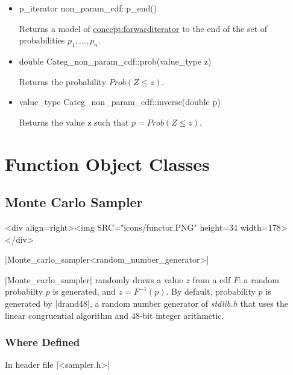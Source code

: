 \documentclass[12pt,twoside]{report}
\begin{document}
\begin{itemize}
\item
 \begin{code}
p_iterator non_param_cdf::p_end()
\end{code}

Returns a model of \hyperref{Forward Iterator}{Forward Iterator (see Section}{)}{concept:forwarditerator} to the end of the set of probabilities $p_1,\ldots,p_n$.



\item 
\begin{code}
double Categ_non_param_cdf::prob(value_type z)
\end{code}

Returns the probability $Prob(Z \le z)$.

\item 
\begin{code}
value_type Categ_non_param_cdf::inverse(double p)
\end{code}

Returns the value z such that $p=Prob(Z \le z)$.

\end{itemize}





\section{Function Object Classes}


\subsection{Monte Carlo Sampler}
\begin{htmlonly}
<div align=right><img SRC="icons/functor.PNG" height=34 width=178></div>
\end{htmlonly}

|Monte_carlo_sampler<random_number_generator>|
\vspace{0.3cm}

|Monte_carlo_sampler| randomly draws a value $z$ from a cdf $F$: a random probabilty $p$ is generated, and $z=F^{-1}(p)$. By default, probability $p$ is generated by |drand48|, a random number generator of \emph{stdlib.h} that uses the linear congruential algorithm and 48-bit integer arithmetic.


\htmlrule[CLEAR=all]  \subsubsection*{Where Defined}
In header file |<sampler.h>|
\end{document}
